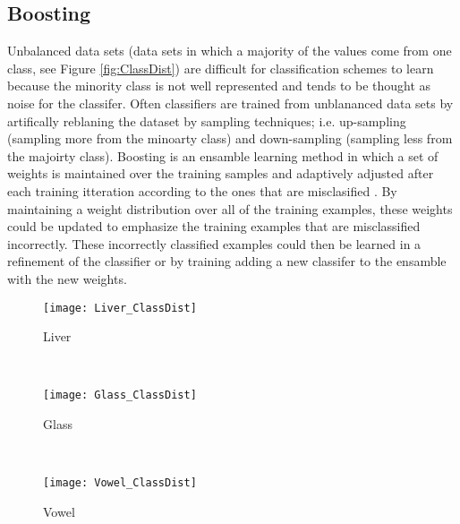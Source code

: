 \subsection{Boosting}
Unbalanced data sets (data sets in which a majority of the values come from one class, see Figure \ref{fig:ClassDist}) are difficult for classification schemes to learn because the minority class is not well represented and tends to be thought as noise for the classifer.
Often classifiers are trained from unblananced data sets by artifically reblaning the dataset by sampling techniques; i.e. up-sampling (sampling more from the minoarty class) and down-sampling (sampling less from the majoirty class).
Boosting is an ensamble learning method in which a set of weights is maintained over the training samples and adaptively adjusted after each training itteration according to the ones that are misclasified \cite{li_adaboost_2008}.
By maintaining a weight distribution over all of the training examples, these weights could be updated to emphasize the training examples that are misclassified incorrectly.  These incorrectly classified examples could then be learned in a refinement of the classifier or by training adding a new classifer to the ensamble with the new weights.
\begin{figure*}[ht!]
	\centering
	\begin{subfigure}[b]{0.3\textwidth}
		\centering
		\texttt{[image: Liver\_ClassDist]}
        \caption{Liver}
	\end{subfigure}%
	~
	\begin{subfigure}[b]{0.3\textwidth}
		\centering
		\texttt{[image: Glass\_ClassDist]}
        \caption{Glass}
	\end{subfigure}	
    ~
	\begin{subfigure}[b]{0.3\textwidth}
		\centering
		\texttt{[image: Vowel\_ClassDist]}
        \caption{Vowel}
	\end{subfigure}%
	\caption{Distribution of Class Data}
	\label{fig:ClassDist}
\end{figure*}
